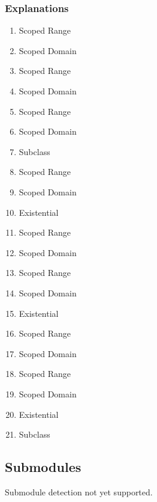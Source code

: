 \subsubsection{Explanations}
\begin{enumerate}
  \item Scoped Range
  \item Scoped Domain
  \item Scoped Range
  \item Scoped Domain
  \item Scoped Range
  \item Scoped Domain
  \item Subclass
  \item Scoped Range
  \item Scoped Domain
  \item Existential
  \item Scoped Range
  \item Scoped Domain
  \item Scoped Range
  \item Scoped Domain
  \item Existential
  \item Scoped Range
  \item Scoped Domain
  \item Scoped Range
  \item Scoped Domain
  \item Existential
  \item Subclass
\end{enumerate}

\subsection{Submodules}
\label{ssec:submodules}
Submodule detection not yet supported.

